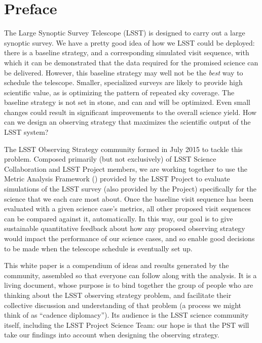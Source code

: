 \setcounter{chapter}{0}
\chapter*{Preface}
\def\chpname{preface}\label{chp:\chpname}
\markboth{}{}

\noindent The Large Synoptic Survey Telescope (LSST) is designed to
carry out a large synoptic survey.  We have a pretty good idea of how we
LSST could be deployed: there is a baseline strategy, and a
corresponding simulated visit sequence, with which it can be
demonstrated that the data required for the promised science can be
delivered. However, this baseline strategy may well not be the {\it
best} way to schedule the telescope. Smaller, specialized surveys are
likely to provide high scientific value, as is optimizing the pattern of
repeated sky coverage.  The baseline strategy is not set in stone, and
can and will be optimized. Even small changes could result in
significant improvements to the overall science yield. How can we design
an observing strategy that maximizes the scientific output of the LSST
system?

\noindent The LSST Observing Strategy community formed in July 2015 to
tackle this problem. Composed primarily (but not exclusively) of  LSST
Science Collaboration and LSST Project members, we are working together
to use the Metric Analysis Framework (\MAF) provided by the LSST Project
to evaluate \OpSim simulations of the LSST survey (also provided by the
Project) specifically for the science that we each care most about. Once
the baseline visit sequence has been evaluated with a given science
case's metrics, all other proposed visit sequences can be compared
against it, automatically. In this way, our goal is to give sustainable
quantitative feedback about how any proposed observing strategy would
impact the performance of our science cases, and so enable good
decisions to be made when the telescope schedule is eventually set up.

\noindent This white paper is a compendium of ideas and results
generated by the community, assembled so that everyone can follow along
with the analysis.
It is a living document, whose purpose is to bind
together the group of people who are thinking about the LSST observing
strategy problem, and facilitate their collective discussion and
understanding of that problem (a process we might think of as  ``cadence
diplomacy'').
Its audience is the LSST science community itself, including the LSST
Project Science Team: our hope is that the PST will take our findings
into account when designing the observing strategy.

